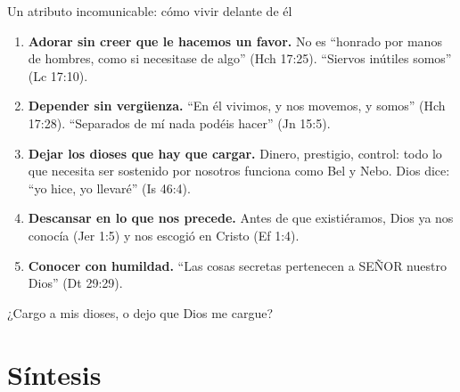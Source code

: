 \documentclass[hyperref={bookmarks=false},aspectratio=169]{beamer}
\newcommand{\SENOR}{S{\fontsize{0.78em}{1em}\selectfont EÑOR}}
\begin{document}
\begin{frame}{Un atributo incomunicable: cómo vivir delante de él}
\scriptsize
\begin{enumerate}
\item \textbf{Adorar sin creer que le hacemos un favor.} No es ``honrado por manos de hombres, como si necesitase de algo'' (Hch 17:25). ``Siervos inútiles somos'' (Lc 17:10).
\item \textbf{Depender sin vergüenza.} ``En él vivimos, y nos movemos, y somos'' (Hch 17:28). ``Separados de mí nada podéis hacer'' (Jn 15:5).
\item \textbf{Dejar los dioses que hay que cargar.} Dinero, prestigio, control: todo lo que necesita ser sostenido por nosotros funciona como Bel y Nebo. Dios dice: ``yo hice, yo llevaré'' (Is 46:4).
\item \textbf{Descansar en lo que nos precede.} Antes de que existiéramos, Dios ya nos conocía (Jer 1:5) y nos escogió en Cristo (Ef 1:4).
\item \textbf{Conocer con humildad.} ``Las cosas secretas pertenecen a \SENOR{} nuestro Dios'' (Dt 29:29).
\end{enumerate}\medskip
\begin{tcolorbox}[colback=papiro,colframe=dorado,boxrule=1.2pt,arc=3pt]
\centering\small ¿Cargo a mis dioses, o dejo que Dios me cargue?
\end{tcolorbox}
\end{frame}

\section{Síntesis}
\end{document}
